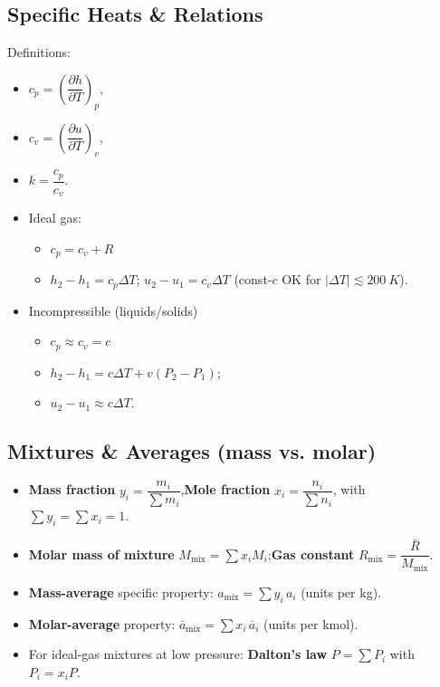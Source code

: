 \documentclass[10pt]{article}
\begin{document}
\begin{multicols}{2}
\subsection{Specific Heats \& Relations}
Definitions:
\begin{itemize}
    \item $c_p=\left(\dfrac{\partial h}{\partial T}\right)_p$,\quad
    \item $c_v=\left(\dfrac{\partial u}{\partial T}\right)_v$,\quad
    \item $k=\dfrac{c_p}{c_v}$.
    \item  Ideal gas:
    \begin{itemize}
        \item $c_p=c_v+R$
        \item $h_2-h_1=c_p\Delta T$; $u_2-u_1=c_v\Delta T$ (const-$c$ OK for $|\Delta T|\lesssim \SI{200}{K}$).
    \end{itemize}
    \item Incompressible (liquids/solids)
    \begin{itemize}
        \item $c_p\approx c_v=c$
        \item $h_2-h_1=c\Delta T + v(P_2-P_1)$;
        \item $u_2-u_1\approx c\Delta T$.
    \end{itemize}
\end{itemize}

\subsection{Mixtures \& Averages (mass vs. molar)}
\begin{itemize}
    \item \textbf{Mass fraction} $y_i=\dfrac{m_i}{\sum m_i}$,\quad \textbf{Mole fraction} $x_i=\dfrac{n_i}{\sum n_i}$, with $\sum y_i=\sum x_i=1$.
    \item \textbf{Molar mass of mixture} $M_{\text{mix}}=\sum x_i M_i$;\quad \textbf{Gas constant} $R_{\text{mix}}=\dfrac{\bar R}{M_{\text{mix}}}$.
    \item \textbf{Mass-average} specific property: $a_{\text{mix}}=\sum y_i\,a_i$ (units per kg).
    \item \textbf{Molar-average} property: $\bar{a}_{\text{mix}}=\sum x_i\,\bar{a}_i$ (units per kmol).
    \item For ideal-gas mixtures at low pressure: \textbf{Dalton’s law} $P=\sum P_i$ with $P_i=x_i P$.
\end{itemize}

\end{multicols}
\end{document}
